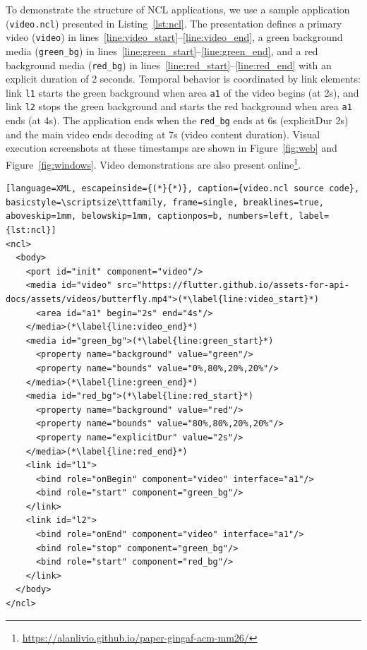 \documentclass[sigconf]{acmart}
\begin{document}
To demonstrate the structure of NCL applications, we use a sample application (\texttt{video.ncl}) presented in Listing~\ref{lst:ncl}. The presentation defines a primary video (\texttt{video}) in lines~\ref{line:video_start}--\ref{line:video_end}, a green background media (\texttt{green\_bg}) in lines~\ref{line:green_start}--\ref{line:green_end}, and a red background media (\texttt{red\_bg}) in lines~\ref{line:red_start}--\ref{line:red_end} with an explicit duration of 2 seconds. Temporal behavior is coordinated by link elements: link \texttt{l1} starts the green background when area \texttt{a1} of the video begins (at 2s), and link \texttt{l2} stops the green background and starts the red background when area \texttt{a1} ends (at 4s). The application ends when the \texttt{red\_bg} ends at 6s (explicitDur 2s) and the main video ends decoding at 7s (video content duration). Visual execution screenshots at these timestamps are shown in Figure~\ref{fig:web} and Figure~\ref{fig:windows}. Video demonstrations are also present online\footnote{\url{https://alanlivio.github.io/paper-gingaf-acm-mm26/}}. 

\begin{lstlisting}[language=XML, escapeinside={(*}{*)}, caption={video.ncl source code}, basicstyle=\scriptsize\ttfamily, frame=single, breaklines=true, aboveskip=1mm, belowskip=1mm, captionpos=b, numbers=left, label={lst:ncl}]
<ncl>
  <body>
    <port id="init" component="video"/>
    <media id="video" src="https://flutter.github.io/assets-for-api-docs/assets/videos/butterfly.mp4">(*\label{line:video_start}*)
      <area id="a1" begin="2s" end="4s"/>
    </media>(*\label{line:video_end}*)
    <media id="green_bg">(*\label{line:green_start}*)
      <property name="background" value="green"/>
      <property name="bounds" value="0%,80%,20%,20%"/>
    </media>(*\label{line:green_end}*)
    <media id="red_bg">(*\label{line:red_start}*)
      <property name="background" value="red"/>
      <property name="bounds" value="80%,80%,20%,20%"/>
      <property name="explicitDur" value="2s"/>
    </media>(*\label{line:red_end}*)
    <link id="l1">
      <bind role="onBegin" component="video" interface="a1"/>
      <bind role="start" component="green_bg"/>
    </link>
    <link id="l2">
      <bind role="onEnd" component="video" interface="a1"/>
      <bind role="stop" component="green_bg"/>
      <bind role="start" component="red_bg"/>
    </link>
  </body>
</ncl>
\end{lstlisting}
\end{document}
